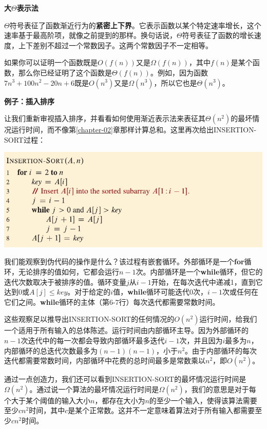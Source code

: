 \documentclass[lang=cn,newtx,10pt,scheme=chinese]{elegantbook}
\begin{document}
\textbf{大$\Theta$表示法}

$\Theta$符号表征了函数渐近行为的\textbf{紧密上下界}。它表示函数以某个特定速率增长，这个速率基于最高阶项，就像之前提到的那样。换句话说，$\Theta$符号表征了函数的增长速度，上下差别不超过一个常数因子。这两个常数因子不一定相等。

如果你可以证明一个函数既是$O(f(n))$又是$\Omega(f(n))$，其中$f(n)$是某个函数，那么你已经证明了这个函数是$\Theta(f(n))$。例如，因为函数$7 n^3+100 n^2-20 n+6$既是$O\left(n^3\right)$又是$\Omega\left(n^3\right)$，所以它也是$\Theta\left(n^3\right)$。

\textbf{例子：插入排序}

让我们重新审视插入排序，并看看如何使用渐近表示法来表征其$\Theta\left(n^2\right)$的最坏情况运行时间，而不像第\ref{chapter-02}章那样计算总和。这里再次给出INSERTION-SORT过程：

\includegraphics{算法导论第四版插图/第二章/插入排序伪代码.pdf}

我们能观察到伪代码的操作是什么？该过程有嵌套循环。外部循环是一个\textbf{for}循环，无论排序的值如何，它都会运行$n-1$次。内部循环是一个\textbf{while}循环，但它的迭代次数取决于被排序的值。循环变量$j$从$i-1$开始，在每次迭代中递减1，直到它达到0或$A[j]\leq key$。对于给定的$i$值，\textbf{while}循环可能迭代0次，$i-1$次或任何在它们之间。\textbf{while}循环的主体（第6-7行）每次迭代都需要常数时间。

这些观察足以推导出INSERTION-SORT的任何情况的$O\left(n^2\right)$运行时间，给我们一个适用于所有输入的总体陈述。运行时间由内部循环主导。因为外部循环的$n-1$次迭代中的每一次都会导致内部循环最多迭代$i-1$次，并且因为$i$最多为$n$，内部循环的总迭代次数最多为$(n-1)(n-1)$，小于$n^2$。由于内部循环的每次迭代都需要常数时间，内部循环中花费的总时间最多是常数乘以$n^2$，即$O\left(n^2\right)$。

通过一点创造力，我们还可以看到INSERTION-SORT的最坏情况运行时间是$\Omega\left(n^2\right)$。通过说一个算法的最坏情况运行时间是$\Omega\left(n^2\right)$，我们的意思是对于每个大于某个阈值的输入大小$n$，都存在大小为$n$的至少一个输入，使得该算法需要至少$c n^2$时间，其中$c$是某个正常数。这并不一定意味着算法对于所有输入都需要至少$c n^2$时间。
\end{document}
